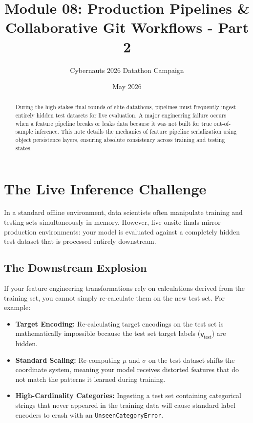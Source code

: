 \documentclass{article}
\title{Module 08: Production Pipelines \& Collaborative Git Workflows - Part 2}
\author{Cybernauts 2026 Datathon Campaign}
\date{May 2026}
\begin{document}
\maketitle

\begin{abstract}
During the high-stakes final rounds of elite datathons, pipelines must frequently ingest entirely hidden test datasets for live evaluation. A major engineering failure occurs when a feature pipeline breaks or leaks data because it was not built for true out-of-sample inference. This note details the mechanics of feature pipeline serialization using object persistence layers, ensuring absolute consistency across training and testing states.
\end{abstract}

\tableofcontents
\newpage

\section{The Live Inference Challenge}
In a standard offline environment, data scientists often manipulate training and testing sets simultaneously in memory. However, live onsite finals mirror production environments: your model is evaluated against a completely hidden test dataset that is processed entirely downstream.

\subsection{The Downstream Explosion}
If your feature engineering transformations rely on calculations derived from the training set, you cannot simply re-calculate them on the new test set. For example:
\begin{itemize}
    \item \textbf{Target Encoding:} Re-calculating target encodings on the test set is mathematically impossible because the test set target labels ($y_{\text{test}}$) are hidden.
    \item \textbf{Standard Scaling:} Re-computing $\mu$ and $\sigma$ on the test dataset shifts the coordinate system, meaning your model receives distorted features that do not match the patterns it learned during training.
    \item \textbf{High-Cardinality Categories:} Ingesting a test set containing categorical strings that never appeared in the training data will cause standard label encoders to crash with an \texttt{UnseenCategoryError}.
\end{itemize}
\end{document}
